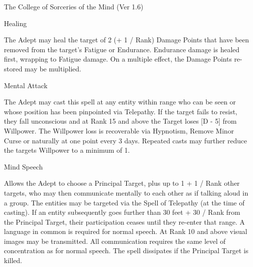 \begin{Chapter}{The College of Sorceries of the Mind (Ver 1.6)}
\begin{spell}[S-3]{Healing }

\begin{effects}
The Adept may heal the target of 2 (+ 1 / Rank) Damage Points that
have been removed from the target’s Fatigue or Endurance. Endurance
damage is healed first, wrapping to Fatigue damage.  On a multiple
effect, the Damage Points re- stored may be multiplied.
\end{effects}
\end{spell}

\begin{spell}[S-4]{Mental Attack }

\begin{effects}
The Adept may cast this spell at any entity within range who can be
seen or whose position has been pinpointed via Telepathy.  If the
target fails to resist, they fall unconscious and at Rank 15 and above
the Target loses [D - 5] from Willpower.  The Willpower loss is
recoverable via Hypnotism, Remove Minor Curse or naturally at one
point every 3 days.  Repeated casts may further reduce the targets
Willpower to a minimum of 1.
\end{effects}
\end{spell}

\begin{spell}[S-5]{Mind Speech }

\begin{effects}
Allows the Adept to choose a Principal Target, plus up to 1 + 1 / Rank
other targets, who may then communicate mentally to each other as if
talking aloud in a group.  The entities may be targeted via the Spell
of Telepathy (at the time of casting). If an entity subsequently goes
further than 30 feet + 30 / Rank from the Principal Target, their
participation ceases until they re-enter that range.  A language in
common is required for normal speech.  At Rank 10 and above visual
images may be transmitted.  All communication requires the same level
of concentration as for normal speech.  The spell dissipates if the
Principal Target is killed.


\end{effects}
\end{spell}
\end{Chapter}
